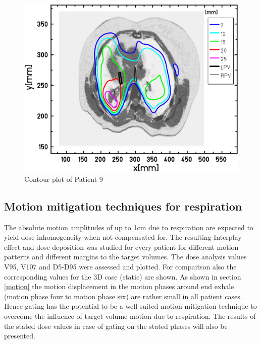 \documentclass[type=dr, dr=rernat, accentcolor=tud7b,colorbacktitle, bigchapter, openright, twoside, 12pt ]{tudthesis}
\begin{document}
\begin{figure}[H]
\begin{center}
 \includegraphics[scale=0.22]{Contour_z_abs_RESP_Pat122_gedreht.png}
\caption{Contour plot of Patient 9 }
\label{contour_pat122}
\end{center}
\end{figure}

\newpage



% 




\subsection{Motion mitigation techniques for respiration}
\label{mmt}
The absolute motion amplitudes of up to 1cm due to respiration are expected to yield dose inhomogeneity when not compensated for. The 
resulting Interplay effect and dose deposition was studied for every patient for different motion patterns and different margins to the target 
volumes. The dose analysis values V95, V107 and D5-D95 were assessed and plotted. For comparison also the corresponding 
values for the 3D case (static) are shown. As shown in section \ref{motion} the motion displacement in the motion phases around 
end exhale (motion phase four to motion phase six) are rather small in all patient cases. Hence gating has the potential to be a 
well-suited motion mitigation technique to overcome the influence of target volume motion due to respiration. The results of the stated dose 
values in case of gating on the stated phases will also be presented. 
\end{document}
